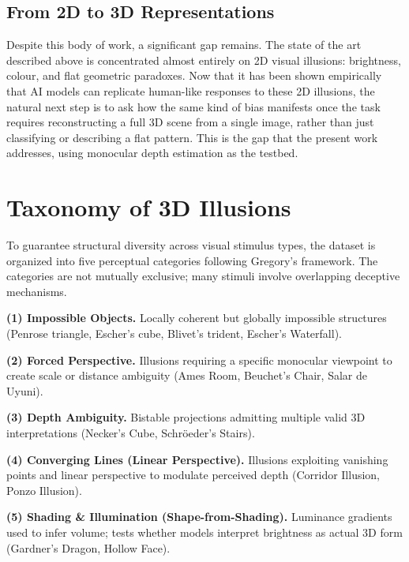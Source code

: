 \documentclass[10pt,twocolumn]{article}
\begin{document}
\subsection{From 2D to 3D Representations}

Despite this body of work, a significant gap remains. The state of the art described
above is concentrated almost entirely on 2D visual illusions: brightness, colour, and
flat geometric paradoxes. Now that it has been shown empirically that AI models can
replicate human-like responses to these 2D illusions, the natural next step is to ask how
the same kind of bias manifests once the task requires reconstructing a full 3D scene
from a single image, rather than just classifying or describing a flat pattern. This is the
gap that the present work addresses, using monocular depth estimation as the testbed.

\section{Taxonomy of 3D Illusions}
\label{sec:taxonomy}

To guarantee structural diversity across visual stimulus types, the dataset is organized into five perceptual categories
following Gregory's framework. The categories are not mutually exclusive; many stimuli
involve overlapping deceptive mechanisms.

\textbf{(1) Impossible Objects.} Locally coherent but globally impossible structures
(Penrose triangle, Escher's cube, Blivet's trident, Escher's Waterfall).

\textbf{(2) Forced Perspective.} Illusions requiring a specific monocular viewpoint to
create scale or distance ambiguity (Ames Room, Beuchet's Chair, Salar de Uyuni).

\textbf{(3) Depth Ambiguity.} Bistable projections admitting multiple valid 3D
interpretations (Necker's Cube, Schröeder's Stairs).

\textbf{(4) Converging Lines (Linear Perspective).} Illusions exploiting vanishing points
and linear perspective to modulate perceived depth (Corridor Illusion, Ponzo Illusion).

\textbf{(5) Shading \& Illumination (Shape-from-Shading).} Luminance gradients used to
infer volume; tests whether models interpret brightness as actual 3D form (Gardner's
Dragon, Hollow Face).

\end{document}
